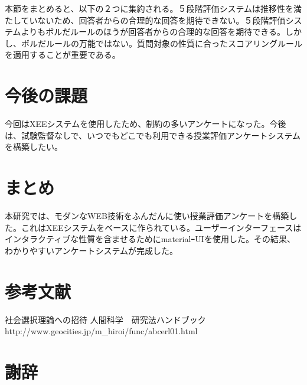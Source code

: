 \documentclass[11pt,a4paper]{jsarticle}
\begin{document}
本節をまとめると、以下の２つに集約される。５段階評価システムは推移性を満たしていないため、回答者からの合理的な回答を期待できない。５段階評価システムよりもボルだルールのほうが回答者からの合理的な回答を期待できる。しかし、ボルだルールの万能ではない。質問対象の性質に合ったスコアリングルールを適用することが重要である。
\section{今後の課題}
今回はXEEシステムを使用したため、制約の多いアンケートになった。今後は、試験監督なしで、いつでもどこでも利用できる授業評価アンケートシステムを構築したい。
\section{まとめ}
本研究では、モダンなWEB技術をふんだんに使い授業評価アンケートを構築した。これはXEEシステムをベースに作られている。ユーザーインターフェースはインタラクティブな性質を含ませるためにmaterialｰUIを使用した。その結果、わかりやすいアンケートシステムが完成した。
\section{参考文献}
社会選択理論への招待
人間科学　研究法ハンドブック
http://www.geocities.jp/m_hiroi/func/abcerl01.html
\section{謝辞}
%
%
\end{document}
